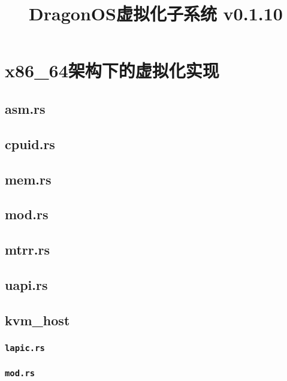 \documentclass[code]{mancls}
\title{DragonOS虚拟化子系统 v0.1.10}
\begin{document}
\section{x86\_64架构下的虚拟化实现}

\subsection{asm.rs}


\subsection{cpuid.rs}


\subsection{mem.rs}


\subsection{mod.rs}


\subsection{mtrr.rs}


\subsection{uapi.rs}


\subsection{kvm\_host}

\subsubsection{\texttt{lapic.rs}}


\subsubsection{\texttt{mod.rs}}

\end{document}
